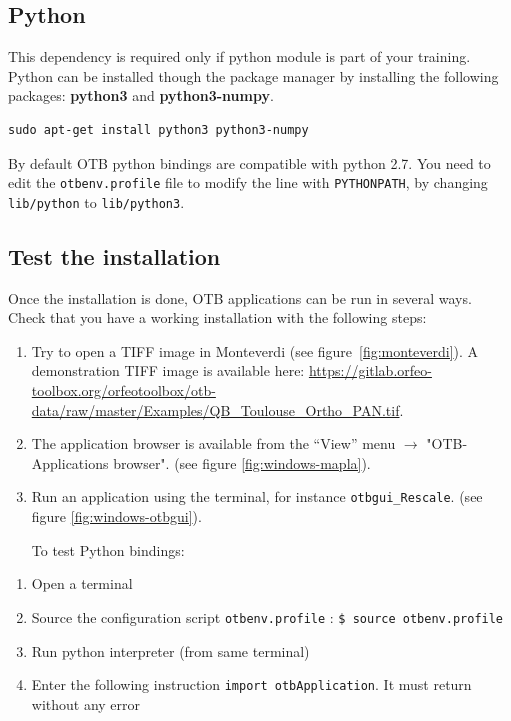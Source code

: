 \documentclass[10pt,a4paper]{article}
\begin{document}
\subsection{Python}

This dependency is required only if python module is part of your training. Python can be installed though the package manager by installing the following packages: \textbf{python3} and \textbf{python3-numpy}.
\begin{verbatim}
sudo apt-get install python3 python3-numpy
\end{verbatim}

By default OTB python bindings are compatible with python 2.7. You need to edit the \verb?otbenv.profile? file to modify the line with \verb?PYTHONPATH?, by changing \verb?lib/python? to \verb?lib/python3?.


\subsection{Test the installation}
Once the installation is done, OTB applications can be run in several ways. Check that you have a working installation with the following steps:
\begin{enumerate}

\item Try to open a TIFF image in Monteverdi (see
figure~\ref{fig:monteverdi}). A demonstration TIFF image is available here: \url{https://gitlab.orfeo-toolbox.org/orfeotoolbox/otb-data/raw/master/Examples/QB\_Toulouse\_Ortho\_PAN.tif}.

\item The application browser is available from the ``View'' menu 
$\rightarrow$ "OTB-Applications browser".
(see figure \ref{fig:windows-mapla}).

\item Run an application using the terminal, for instance
\texttt{otbgui\_Rescale}. (see figure \ref{fig:windows-otbgui}).

To test Python bindings:

\end{enumerate}

\begin{enumerate}
 \item Open a terminal
 \item Source the configuration script \verb?otbenv.profile? : \verb?$ source otbenv.profile?
 \item Run python interpreter (from same terminal)
 \item Enter the following instruction \verb?import otbApplication?. It must return without any error
\end{enumerate}
\end{document}

